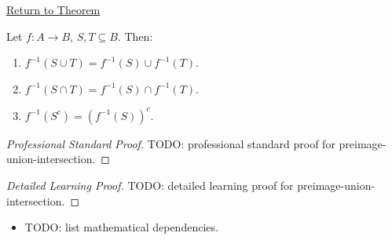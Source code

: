 \newpage
{}
\label{prf:preimage-union-intersection}

\begin{remark*}[Return]
\hyperref[prop:preimage-union-intersection]{Return to Theorem}
\end{remark*}

\begin{theorem*}
Let $f:A\to B$, $S,T\subseteq B$. Then:
\begin{enumerate}[label=(\roman*)]
  \item $f^{-1}(S\cup T)=f^{-1}(S)\cup f^{-1}(T)$.
  \item $f^{-1}(S\cap T)=f^{-1}(S)\cap f^{-1}(T)$.
  \item $f^{-1}(S^c)=(f^{-1}(S))^c$.
\end{enumerate}

\smallskip\noindent
\end{theorem*}

\begin{proof}[Professional Standard Proof]
\LRAProofBodyStart
TODO: professional standard proof for preimage-union-intersection.
\end{proof}

\begin{proof}[Detailed Learning Proof]
\LRAProofBodyStart
TODO: detailed learning proof for preimage-union-intersection.
\end{proof}

\begin{remark*}
\end{remark*}

\begin{dependencies}
\begin{itemize}
  \item TODO: list mathematical dependencies.
\end{itemize}
\end{dependencies}

\clearpage
